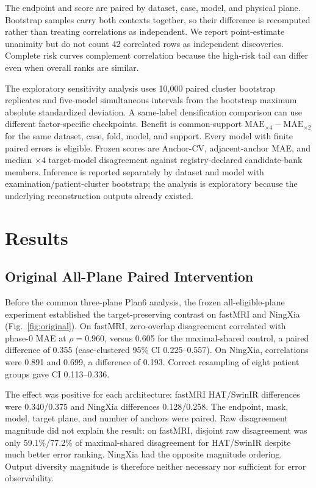 \documentclass[journal,10pt]{IEEEtran}
\begin{document}
The endpoint and score are paired by dataset, case, model, and physical plane. Bootstrap samples carry both contexts together, so their difference is recomputed rather than treating correlations as independent. We report point-estimate unanimity but do not count 42 correlated rows as independent discoveries. Complete risk curves complement correlation because the high-risk tail can differ even when overall ranks are similar.

The exploratory sensitivity analysis uses 10,000 paired cluster bootstrap replicates and five-model simultaneous intervals from the bootstrap maximum absolute standardized deviation. A same-label densification comparison can use different factor-specific checkpoints. Benefit is common-support $\mathrm{MAE}_{\times4}-\mathrm{MAE}_{\times2}$ for the same dataset, case, fold, model, and support. Every model with finite paired errors is eligible. Frozen scores are Anchor-CV, adjacent-anchor MAE, and median $\times4$ target-model disagreement against registry-declared candidate-bank members. Inference is reported separately by dataset and model with examination/patient-cluster bootstrap; the analysis is exploratory because the underlying reconstruction outputs already existed.

\section{Results}
\subsection{Original All-Plane Paired Intervention}
Before the common three-plane Plan6 analysis, the frozen all-eligible-plane experiment established the target-preserving contrast on fastMRI and NingXia (Fig.~\ref{fig:original}). On fastMRI, zero-overlap disagreement correlated with phase-0 MAE at $\rho=0.960$, versus 0.605 for the maximal-shared control, a paired difference of 0.355 (case-clustered 95\% CI 0.225--0.557). On NingXia, correlations were 0.891 and 0.699, a difference of 0.193. Correct resampling of eight patient groups gave CI 0.113--0.336.

The effect was positive for each architecture: fastMRI HAT/SwinIR differences were 0.340/0.375 and NingXia differences 0.128/0.258. The endpoint, mask, model, target plane, and number of anchors were paired. Raw disagreement magnitude did not explain the result: on fastMRI, disjoint raw disagreement was only 59.1\%/77.2\% of maximal-shared disagreement for HAT/SwinIR despite much better error ranking. NingXia had the opposite magnitude ordering. Output diversity magnitude is therefore neither necessary nor sufficient for error observability.
\end{document}
